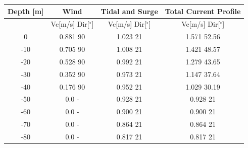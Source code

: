 \begin{table} [H]
\centering
\begin{tabular}{ |c|c|c|c|}
\hline
Depth [m] & Wind & Tidal and Surge & Total Current Profile \\
 \hline
 \hline
 & Vc[m/s] \hspace{0.3cm} Dir[$^{\circ}$] &  Vc[m/s] \hspace{0.3cm} Dir[$^{\circ}$] & Vc[m/s] \hspace{0.3cm} Dir[$^{\circ}$] \\
 \hline
 0 & 0.881 \hspace{0.7cm} 90 & 1.023 \hspace{0.7cm} 21  & 1.571 \hspace{0.7cm} 52.56 \\
 -10 & 0.705 \hspace{0.7cm} 90 & 1.008 \hspace{0.7cm} 21  & 1.421 \hspace{0.7cm} 48.57 \\
 -20 & 0.528 \hspace{0.7cm} 90 & 0.992 \hspace{0.7cm} 21  & 1.279
 \hspace{0.7cm} 43.65 \\
 -30 & 0.352 \hspace{0.7cm} 90 & 0.973 \hspace{0.7cm} 21  & 1.147 \hspace{0.7cm} 37.64 \\
 -40 & 0.176 \hspace{0.7cm} 90 & 0.952 \hspace{0.7cm} 21  & 1.029 \hspace{0.7cm} 30.19 \\
 -50 & 0.0 \hspace{0.7cm} - & 0.928 \hspace{0.7cm} 21  & 0.928 \hspace{1.15cm} 21 \\
  -60 & 0.0 \hspace{0.7cm} - & 0.900 \hspace{0.7cm} 21  & 0.900 \hspace{1.15cm} 21 \\
 -70 & 0.0 \hspace{0.7cm} - & 0.864 \hspace{0.7cm} 21  & 0.864 \hspace{1.15cm} 21 \\
  -80 & 0.0 \hspace{0.7cm} - & 0.817 \hspace{0.7cm} 21  & 0.817 \hspace{1.15cm} 21 \\

\end{tabular}
\end{table}
